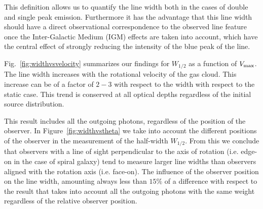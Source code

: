 \documentclass[usenatbib]{mn2e}
\begin{document}
This definition allows us to quantify the line width both in the cases
of double and single peak emission. Furthermore it has the advantage
that this line width should have a direct observational correspondence
to the observed line feature once the Inter-Galactic Medium (IGM)
effects are taken into account, which have the central effect of
strongly reducing the intensity of the blue peak of the line.

Fig.~\ref{fig:widthvsvelocity} summarizes our findings for $W_{1/2}$
as a function of $V_{\rm max}$. The line width increases with the
rotational velocity of the gas cloud. This increase can be of a factor
of $2-3$ with respect to the width with respect to the static
case. This trend is conserved at all optical depths regardless of the
initial source distribution. 

This result includes all the outgoing photons, regardless of the
position of the observer. In Figure~\ref{fig:widthvstheta} we
take into account the different positions of the observer in the
measurement of the half-width $W_{1/2}$. From this we conclude
that observers with a line of sight perpendicular to the axis of
rotation (i.e. edge-on in the case of spiral galaxy) tend to measure
larger line widths than observers aligned with the rotation axis
(i.e. face-on). The influence of the observer position on the line
width, amounting always less than $15\%$ of a difference with respect
to the result that takes into account all the outgoing photons with
the same weight regardless of the relative observer position.


\end{document}
